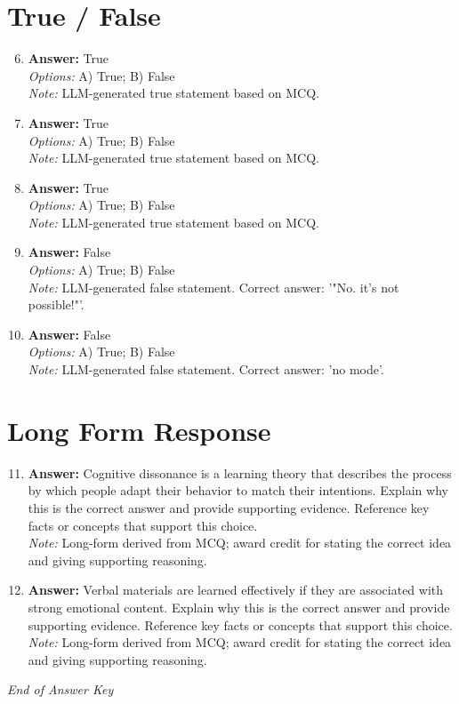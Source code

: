 \documentclass[12pt]{article}
\begin{document}
\section*{True / False}
\begin{enumerate}[label=\arabic*.]
\setcounter{enumi}{5}
\item \textbf{Answer:} True
\\ \textit{Options:} A) True; B) False
\\ \textit{Note:} LLM-generated true statement based on MCQ.
\item \textbf{Answer:} True
\\ \textit{Options:} A) True; B) False
\\ \textit{Note:} LLM-generated true statement based on MCQ.
\item \textbf{Answer:} True
\\ \textit{Options:} A) True; B) False
\\ \textit{Note:} LLM-generated true statement based on MCQ.
\item \textbf{Answer:} False
\\ \textit{Options:} A) True; B) False
\\ \textit{Note:} LLM-generated false statement. Correct answer: '"No. it's not possible!"'.
\item \textbf{Answer:} False
\\ \textit{Options:} A) True; B) False
\\ \textit{Note:} LLM-generated false statement. Correct answer: 'no mode'.
\end{enumerate}

\section*{Long Form Response}
\begin{enumerate}[label=\arabic*.]
\setcounter{enumi}{10}
\item \textbf{Answer:} Cognitive dissonance is a learning theory that describes the process by which people adapt their behavior to match their intentions. Explain why this is the correct answer and provide supporting evidence. Reference key facts or concepts that support this choice.
\\ \textit{Note:} Long-form derived from MCQ; award credit for stating the correct idea and giving supporting reasoning.
\item \textbf{Answer:} Verbal materials are learned effectively if they are associated with strong emotional content. Explain why this is the correct answer and provide supporting evidence. Reference key facts or concepts that support this choice.
\\ \textit{Note:} Long-form derived from MCQ; award credit for stating the correct idea and giving supporting reasoning.
\end{enumerate}

\vfill
\noindent\textit{End of Answer Key}
\end{document}
